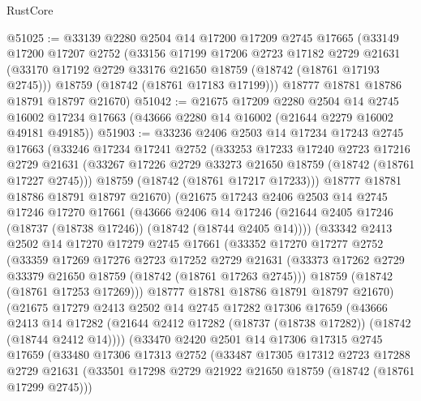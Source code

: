 \begin{lexlean}{RustCore}
\begin{coremodule}
@51025 := @33139
    @2280
    @2504
    @14
    @17200
    @17209
    @2745
    @17665
    (@33149
      @17200
      @17207
      @2752
      (@33156
        @17199
        @17206
        @2723
        @17182
        @2729
        @21631
        (@33170 @17192 @2729 @33176 @21650 @18759 (@18742 (@18761 @17193 @2745)))
        @18759
        (@18742 (@18761 @17183 @17199)))
      @18777
      @18781
      @18786
      @18791
      @18797
      @21670)
@51042 := @21675
    @17209
    @2280
    @2504
    @14
    @2745
    @16002
    @17234
    @17663
    (@43666 @2280 @14 @16002 (@21644 @2279 @16002 @49181 @49185))
@51903 := @33236
    @2406
    @2503
    @14
    @17234
    @17243
    @2745
    @17663
    (@33246
      @17234
      @17241
      @2752
      (@33253
        @17233
        @17240
        @2723
        @17216
        @2729
        @21631
        (@33267 @17226 @2729 @33273 @21650 @18759 (@18742 (@18761 @17227 @2745)))
        @18759
        (@18742 (@18761 @17217 @17233)))
      @18777
      @18781
      @18786
      @18791
      @18797
      @21670)
    (@21675
      @17243
      @2406
      @2503
      @14
      @2745
      @17246
      @17270
      @17661
      (@43666
        @2406
        @14
        @17246
        (@21644 @2405 @17246 (@18737 (@18738 @17246)) (@18742 (@18744 @2405 @14))))
      (@33342
        @2413
        @2502
        @14
        @17270
        @17279
        @2745
        @17661
        (@33352
          @17270
          @17277
          @2752
          (@33359
            @17269
            @17276
            @2723
            @17252
            @2729
            @21631
            (@33373 @17262 @2729 @33379 @21650 @18759 (@18742 (@18761 @17263 @2745)))
            @18759
            (@18742 (@18761 @17253 @17269)))
          @18777
          @18781
          @18786
          @18791
          @18797
          @21670)
        (@21675
          @17279
          @2413
          @2502
          @14
          @2745
          @17282
          @17306
          @17659
          (@43666
            @2413
            @14
            @17282
            (@21644 @2412 @17282 (@18737 (@18738 @17282)) (@18742 (@18744 @2412 @14))))
          (@33470
            @2420
            @2501
            @14
            @17306
            @17315
            @2745
            @17659
            (@33480
              @17306
              @17313
              @2752
              (@33487
                @17305
                @17312
                @2723
                @17288
                @2729
                @21631
                (@33501 @17298 @2729 @21922 @21650 @18759 (@18742 (@18761 @17299 @2745)))

\end{coremodule}
\end{lexlean}
